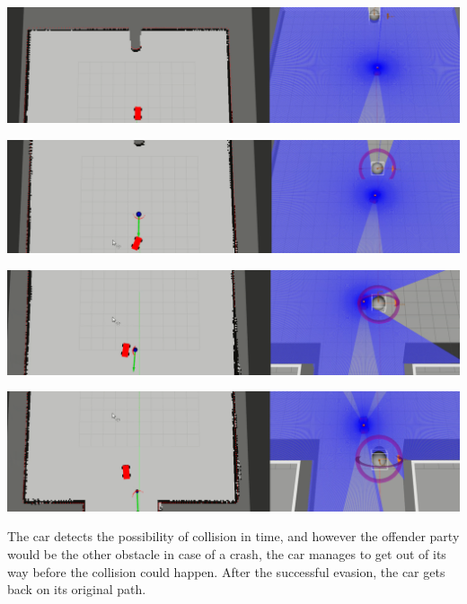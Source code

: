 \begin{minipage}{\textwidth}
	\includegraphics[width=\textwidth]{figures/raw/local_planner_test_straight_traj_faster_obj_from_behind_1.png}

	\vspace{0.5cm}
	\includegraphics[width=\textwidth]{figures/raw/local_planner_test_straight_traj_faster_obj_from_behind_2.png}

	\vspace{0.5cm}
	\includegraphics[width=\textwidth]{figures/raw/local_planner_test_straight_traj_faster_obj_from_behind_3.png}

	\vspace{0.5cm}
	\includegraphics[width=\textwidth]{figures/raw/local_planner_test_straight_traj_faster_obj_from_behind_4.png}

	\label{local_planner_test_straight_traj_faster_obj_from_behind}
\end{minipage}

The car detects the possibility of collision in time, and however the offender party would be the other obstacle in case of a crash, the car manages to get out of its way before the collision could happen. After the successful evasion, the car gets back on its original path.

